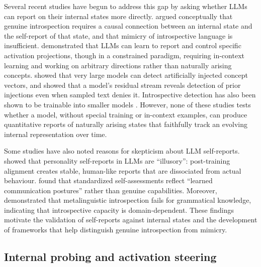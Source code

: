 \documentclass[10pt]{article}
\begin{document}
Several recent studies have begun to address this gap by asking whether LLMs can report on their internal states more directly. \citet{ComShanahan2025} argued conceptually that genuine introspection requires a causal connection between an internal state and the self-report of that state, and that mimicry of introspective language is insufficient. \citet{JiAn2025} demonstrated that LLMs can learn to report and control specific activation projections, though in a constrained paradigm, requiring in-context learning and working on arbitrary directions rather than naturally arising concepts. \citet{Lindsey2026} showed that very large models can detect artificially injected concept vectors, and \citet{PearsonVogel2026} showed that a model's residual stream reveals detection of prior injections even when sampled text denies it. Introspective detection has also been shown to be trainable into smaller models \citet{Rivera2025}. However, none of these studies tests whether a model, without special training or in-context examples, can produce quantitative reports of naturally arising states that faithfully track an evolving internal representation over time.

Some studies have also noted reasons for skepticism about LLM self-reports. \citet{Han2025} showed that personality self-reports in LLMs are ``illusory'': post-training alignment creates stable, human-like reports that are dissociated from actual behaviour. \citet{Jackson2025} found that standardized self-assessments reflect ``learned communication postures'' rather than genuine capabilities. Moreover, \citet{Song2025} demonstrated that metalinguistic introspection fails for grammatical knowledge, indicating that introspective capacity is domain-dependent. These findings motivate the validation of self-reports against internal states and the development of frameworks that help distinguish genuine introspection from mimicry.

\subsection{Internal probing and activation steering}
\label{sec:rw-probing}
\end{document}
